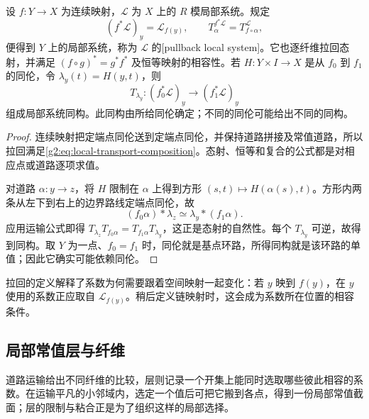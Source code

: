 \begin{proposition}\label{g2:prop:local-system-pullback}
	设 \(f:Y\to X\) 为连续映射，\(\mathcal L\) 为 \(X\) 上的 \(R\) 模局部系统。规定
	\[
		(f^*\mathcal L)_y=\mathcal L_{f(y)},\qquad T^{f^*\mathcal L}_\alpha=T^{\mathcal L}_{f\circ\alpha},
	\]
	便得到 \(Y\) 上的局部系统，称为 \(\mathcal L\) 的[pullback local system]。它也逐纤维拉回态射，并满足 \((f\circ g)^*=g^*f^*\) 及恒等映射的相容性。若 \(H:Y\times I\to X\) 是从 \(f_0\) 到 \(f_1\) 的同伦，令 \(\lambda_y(t)=H(y,t)\)，则
	\[
		T_{\lambda_y}:(f_0^*\mathcal L)_y\longrightarrow(f_1^*\mathcal L)_y
	\]
	组成局部系统同构。此同构由所给同伦确定；不同的同伦可能给出不同的同构。
\end{proposition}
\begin{proof}
	连续映射把定端点同伦送到定端点同伦，并保持道路拼接及常值道路，所以拉回满足\eqref{g2:eq:local-transport-composition}。态射、恒等和复合的公式都是对相应点或道路逐项求值。

	对道路 \(\alpha:y\to z\)，将 \(H\) 限制在 \(\alpha\) 上得到方形 \((s,t)\mapsto H(\alpha(s),t)\)。方形内两条从左下到右上的边界路线定端点同伦，故
	\[
		(f_0\alpha)*\lambda_z\simeq\lambda_y*(f_1\alpha).
	\]
	应用运输公式即得 \(T_{\lambda_z}T_{f_0\alpha}=T_{f_1\alpha}T_{\lambda_y}\)，这正是态射的自然性。每个 \(T_{\lambda_y}\) 可逆，故得到同构。取 \(Y\) 为一点、\(f_0=f_1\) 时，同伦就是基点环路，所得同构就是该环路的单值；因此它确实可能依赖同伦。
\end{proof}

拉回的定义解释了系数为何需要跟着空间映射一起变化：若 \(y\) 映到 \(f(y)\)，在 \(y\) 使用的系数正应取自 \(\mathcal L_{f(y)}\)。稍后定义链映射时，这会成为系数所在位置的相容条件。

\subsection{局部常值层与纤维}
\label{g2:subsec:0501:02}
道路运输给出不同纤维的比较，层则记录一个开集上能同时选取哪些彼此相容的系数。在运输平凡的小邻域内，选定一个值后可把它搬到各点，得到一份局部常值截面；层的限制与粘合正是为了组织这样的局部选择。

